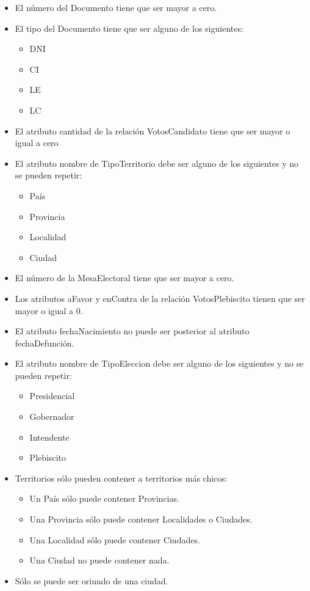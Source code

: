 \begin{itemize}
	\item{El número del Documento tiene que ser mayor a cero}.
	\item{El tipo del Documento tiene que ser alguno de los siguientes:
		\begin{itemize}
			\item{DNI}
			\item{CI}
			\item{LE}
			\item{LC}
		\end{itemize}
	}	
	\item{El atributo cantidad de la relación VotosCandidato tiene que ser mayor o igual a cero}

	\item{El atributo nombre de TipoTerritorio debe ser alguno de los siguientes y no se pueden repetir:
	  \begin{itemize}
	  	\item{País}
	  	\item{Provincia}
	  	\item{Localidad}
	  	\item{Ciudad}
	  \end{itemize}
	 }
	\item{El número de la MesaElectoral tiene que ser mayor a cero.}
	\item{Los  atributos aFavor y enContra de la relación VotosPlebiscito  tienen que ser mayor o igual a 0.}
	\item{El atributo fechaNacimiento no puede ser posterior al atributo fechaDefunción.}
\item{El atributo nombre de TipoEleccion debe ser alguno de los siguientes y no se pueden repetir:
	\begin{itemize}
		\item{Presidencial}
		\item{Gobernador}
		\item{Intendente}
		\item{Plebiscito}
	\end{itemize}
}

\item{Territorios sólo pueden contener a territorios más chicos:
\begin{itemize}
	\item{Un País sólo puede contener Provincias.}
	\item{Una Provincia sólo puede contener Localidades o Ciudades.}
	\item{Una Localidad sólo puede contener Ciudades.}
	\item{Una Ciudad no puede contener nada.}
\end{itemize}
}
\item{Sólo se puede ser oriundo de una ciudad.}


\end{itemize}
